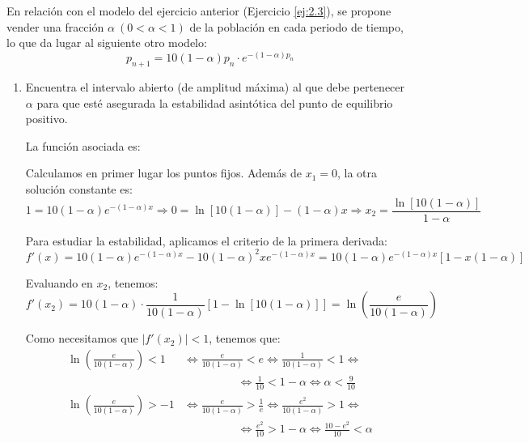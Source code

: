 \begin{ejercicio}
    En relación con el modelo del ejercicio anterior (Ejercicio \ref{ej:2.3}), se propone vender una fracción $\alpha~(0 < \alpha < 1)$ de la población en cada periodo de tiempo, lo que da lugar al siguiente otro modelo:
    \begin{equation*}
        p_{n+1} = 10(1-\alpha)p_n\cdot e^{-(1-\alpha)p_n}
    \end{equation*}
    \begin{enumerate}
        \item Encuentra el intervalo abierto (de amplitud máxima) al que debe pertenecer $\alpha$ para que esté asegurada la estabilidad asintótica del punto de equilibrio positivo.

        La función asociada es:

        Calculamos en primer lugar los puntos fijos. Además de $x_1=0$, la otra solución constante es:
        \begin{equation*}
            1 = 10(1-\alpha)e^{-(1-\alpha)x}
            \Longrightarrow
            0 = \ln[10(1-\alpha)] -(1-\alpha)x
            \Longrightarrow
            x_2 = \dfrac{\ln[10(1-\alpha)]}{1-\alpha}
        \end{equation*}

        Para estudiar la estabilidad, aplicamos el criterio de la primera derivada:
        \begin{equation*}
            f'(x)=10(1-\alpha)e^{-(1-\alpha)x} -10(1-\alpha)^2xe^{-(1-\alpha)x}
            = 10(1-\alpha)e^{-(1-\alpha)x}[1-x(1-\alpha)]
        \end{equation*}

        Evaluando en $x_2$, tenemos:
        \begin{equation*}
            f'(x_2) = 10(1-\alpha)\cdot \frac{1}{10(1-\alpha)}[1-\ln[10(1-\alpha)]]
            = \ln \left(\frac{e}{10(1-\alpha)}\right)
        \end{equation*}

        Como necesitamos que $|f'(x_2)|<1$, tenemos que:
        \begin{align*}
            \ln \left(\frac{e}{10(1-\alpha)}\right)<1 &\Longleftrightarrow
            \frac{e}{10(1-\alpha)}<e 
            \Longleftrightarrow
            \frac{1}{10(1-\alpha)}<1
            \Longleftrightarrow \\&\hspace{2cm}\Longleftrightarrow
            \frac{1}{10}<1-\alpha
            \Longleftrightarrow
            \alpha < \frac{9}{10}\\
            \ln \left(\frac{e}{10(1-\alpha)}\right)>-1 &\Longleftrightarrow
            \frac{e}{10(1-\alpha)}>\frac{1}{e}
            \Longleftrightarrow
            \frac{e^2}{10(1-\alpha)}>1
            \Longleftrightarrow \\&\hspace{2cm}\Longleftrightarrow
            \frac{e^2}{10}>1-\alpha
            \Longleftrightarrow
            \frac{10-e^2}{10}<\alpha
        \end{align*}


\end{enumerate}
\end{ejercicio}
